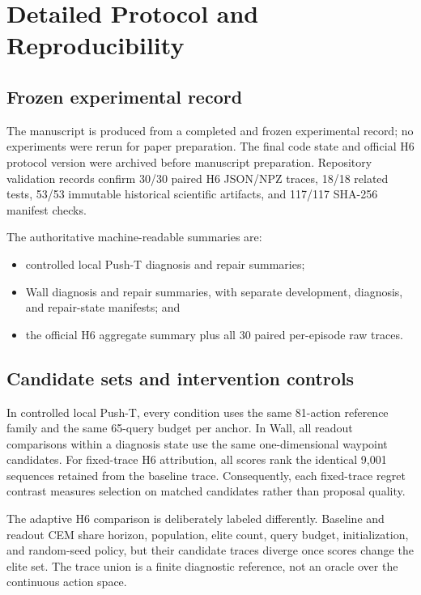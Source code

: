 \section{Detailed Protocol and Reproducibility}
\label{app:repro}

\subsection{Frozen experimental record}

The manuscript is produced from a completed and frozen experimental record; no experiments were rerun for paper preparation. The final code state and official H6 protocol version were archived before manuscript preparation. Repository validation records confirm 30/30 paired H6 JSON/NPZ traces, 18/18 related tests, 53/53 immutable historical scientific artifacts, and 117/117 SHA-256 manifest checks.

The authoritative machine-readable summaries are:
\begin{itemize}
  \item controlled local Push-T diagnosis and repair summaries;
  \item Wall diagnosis and repair summaries, with separate development, diagnosis, and repair-state manifests; and
  \item the official H6 aggregate summary plus all 30 paired per-episode raw traces.
\end{itemize}
\subsection{Candidate sets and intervention controls}

In controlled local Push-T, every condition uses the same 81-action reference family and the same 65-query budget per anchor. In Wall, all readout comparisons within a diagnosis state use the same one-dimensional waypoint candidates. For fixed-trace H6 attribution, all scores rank the identical 9,001 sequences retained from the baseline trace. Consequently, each fixed-trace regret contrast measures selection on matched candidates rather than proposal quality.

The adaptive H6 comparison is deliberately labeled differently. Baseline and readout CEM share horizon, population, elite count, query budget, initialization, and random-seed policy, but their candidate traces diverge once scores change the elite set. The trace union is a finite diagnostic reference, not an oracle over the continuous action space.

